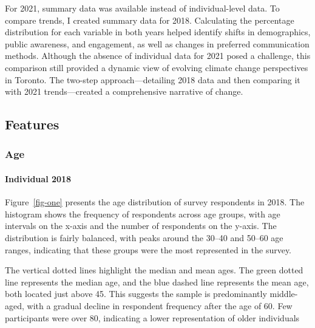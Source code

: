 \documentclass[
  letterpaper,
  DIV=11,
  numbers=noendperiod]{scrartcl}
\let\oldparagraph\paragraph
\renewcommand{\paragraph}[1]{\oldparagraph{#1}\mbox{}}
\begin{document}
For 2021, summary data was available instead of individual-level data.
To compare trends, I created summary data for 2018. Calculating the
percentage distribution for each variable in both years helped identify
shifts in demographics, public awareness, and engagement, as well as
changes in preferred communication methods. Although the absence of
individual data for 2021 posed a challenge, this comparison still
provided a dynamic view of evolving climate change perspectives in
Toronto. The two-step approach---detailing 2018 data and then comparing
it with 2021 trends---created a comprehensive narrative of change.

\subsection{Features}\label{features}

\subsubsection{Age}\label{age}

\paragraph{Individual 2018}\label{individual-2018}

Figure~\ref{fig-one} presents the age distribution of survey respondents
in 2018. The histogram shows the frequency of respondents across age
groups, with age intervals on the x-axis and the number of respondents
on the y-axis. The distribution is fairly balanced, with peaks around
the 30--40 and 50--60 age ranges, indicating that these groups were the
most represented in the survey.

The vertical dotted lines highlight the median and mean ages. The green
dotted line represents the median age, and the blue dashed line
represents the mean age, both located just above 45. This suggests the
sample is predominantly middle-aged, with a gradual decline in
respondent frequency after the age of 60. Few participants were over 80,
indicating a lower representation of older individuals
\end{document}
